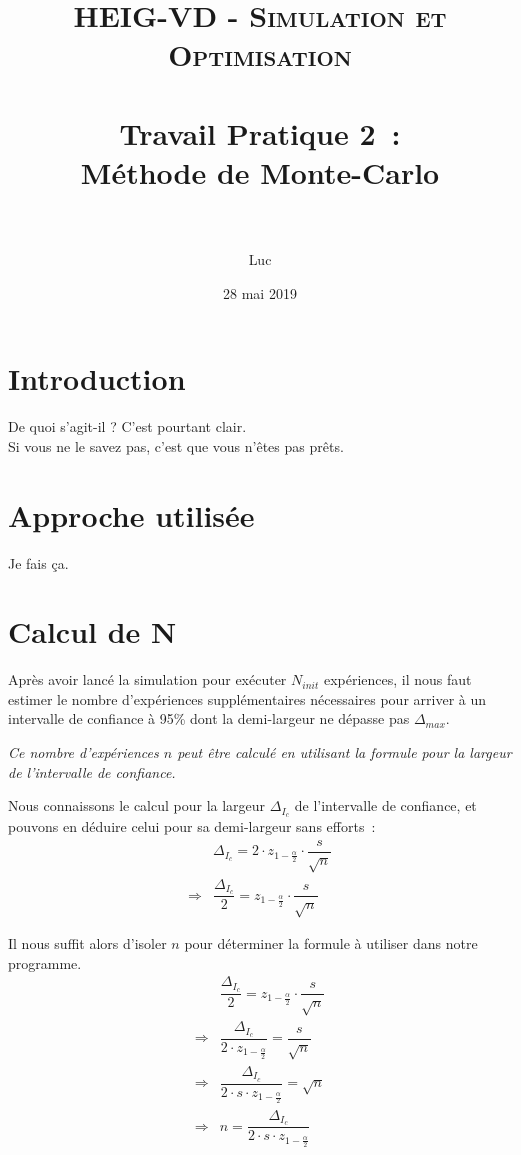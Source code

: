 \documentclass[paper=a4, fontsize=13pt]{scrartcl}
\title{
  \normalfont \normalsize
  \textsc{HEIG-VD - Simulation et Optimisation} \\[10pt]
  \horrule{1pt} \\[0.4cm] %
  \huge Travail Pratique 2~:\\Méthode de Monte-Carlo \\
  \horrule{2pt} \\[0.4cm] %
}
\author{Luc \bsc{Wachter}}
\date{28 mai 2019}
\begin{document}
\lstset{language=Java}

\maketitle

\section{Introduction}
De quoi s'agit-il ? C'est pourtant clair.
\\
Si vous ne le savez pas, c'est que vous n'êtes pas prêts.

\newpage

\section{Approche utilisée}
Je fais ça.

\section{Calcul de N}
Après avoir lancé la simulation pour exécuter $N_{init}$ expériences, il nous faut estimer le nombre d'expériences supplémentaires nécessaires pour arriver à un intervalle de confiance à 95\% dont la demi-largeur ne dépasse pas $\Delta_{max}$.

\textit{Ce nombre d'expériences $n$ peut être calculé en utilisant la formule pour la largeur de l'intervalle de confiance.}

Nous connaissons le calcul pour la largeur \(\Delta_{I_c}\) de l'intervalle de confiance, et pouvons en déduire celui pour sa demi-largeur sans efforts~:
\begin{align*}
  &\Delta_{I_c} = 2\cdot z_{1-\frac{\alpha}{2}}\cdot \dfrac{s}{\sqrt{n}} \\
  \Rightarrow &\dfrac{\Delta_{I_c}}{2} = z_{1-\frac{\alpha}{2}}\cdot \dfrac{s}{\sqrt{n}}
\end{align*}

Il nous suffit alors d'isoler $n$ pour déterminer la formule à utiliser dans notre programme.
\begin{align*}
  &\dfrac{\Delta_{I_c}}{2} = z_{1-\frac{\alpha}{2}}\cdot \dfrac{s}{\sqrt{n}} \\
  \Rightarrow &\dfrac{\Delta_{I_c}}{2\cdot z_{1-\frac{\alpha}{2}}} = \dfrac{s}{\sqrt{n}} \\
  \Rightarrow &\dfrac{\Delta_{I_c}}{2\cdot s\cdot z_{1-\frac{\alpha}{2}}} = \sqrt{n} \\
  \Rightarrow &n = \dfrac{\Delta_{I_c}}{2\cdot s\cdot z_{1-\frac{\alpha}{2}}}
\end{align*}
\end{document}
